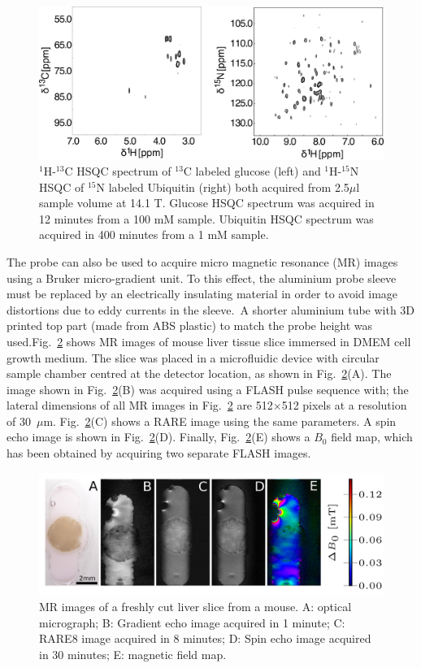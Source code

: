 \documentclass[preprint,5p]{elsarticle}
\newcommand{\fig}[1]{Fig.~\ref{#1}}
\begin{document}
\begin{figure} \centering
\includegraphics[width=\linewidth,keepaspectratio=true]{./figures/ms5n17-tlp-sp-180612-HSQCspect.png}
\caption{ $^1$H-$^{13}$C HSQC spectrum of $^{13}$C labeled glucose (left) and
$^1$H-$^{15}$N HSQC of $^{15}$N labeled Ubiquitin (right) both acquired from
2.5$\mu$l sample volume at 14.1 T. Glucose HSQC spectrum was acquired in 12
minutes from a 100 mM sample. Ubiquitin HSQC spectrum was acquired in 400
minutes from a 1 mM sample.} \label{fig:HSQC} \end{figure}
\cbdelete
The probe can also be used to acquire micro magnetic resonance (MR) images using
a Bruker micro-gradient unit. To this effect, the aluminium probe sleeve must be
replaced by an electrically insulating material in order to avoid image
distortions due to eddy currents in the sleeve.\cbstart\
A shorter aluminium tube with 3D printed top part (made from ABS plastic)
to match the probe height was used.\cbend  \fig{fig:tisli} shows MR images
of mouse liver tissue slice immersed in DMEM cell growth medium. The slice was
placed in a microfluidic device with circular sample chamber centred at the
detector location, as shown in \fig{fig:tisli}(A). The image shown in
\fig{fig:tisli}(B) was acquired using a FLASH pulse sequence with; the lateral dimensions of all MR images in \fig{fig:tisli} are 512$\times$512 pixels at a resolution of 30~$\mu$m. \fig{fig:tisli}(C) shows a
RARE image using the same parameters. A spin echo image is shown in
\fig{fig:tisli}(D). Finally, \fig{fig:tisli}(E) shows a
$B_0$ field map, which has been obtained by acquiring two separate FLASH images.


\begin{figure}
\centering
\includegraphics[width=\linewidth,keepaspectratio=true]{./figures/ms5n17-tisli-im-180511.png}
\caption{MR images of a freshly cut liver slice from a mouse. A: optical micrograph; B: Gradient echo image acquired in 1 minute; C: RARE8 image acquired in 8 minutes; D: Spin echo image acquired in 30 minutes; E: magnetic field map.}
\label{fig:tisli}
\end{figure}
\end{document}
